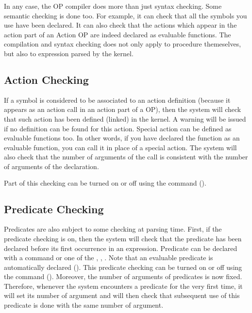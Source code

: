 In any case, the OP compiler does more than just syntax checking. Some
semantic checking is done too. For example, it can check that all the
symbols you use have been declared. It can also check that the actions
which appear in the action part of an Action OP are indeed declared as
evaluable functions. The compilation and syntax checking does not only apply to
procedure themeselves, but also to expression parsed by the kernel.



\subsection{Action Checking}

If a symbol is considered to be associated to an action definition
(because it appears as an action call in an action part of a OP), then
the system will check that such action has been defined (linked) in the
kernel. A warning will be issued if no definition can be found for this
action. Special action can be defined as evaluable functions too. In other
words, if you have declared the function  as an evaluable
function, you can call it in place of a special action. The system will also
check that the number of arguments of the call is consistent with the number of
arguments of the declaration.

Part of this checking can be turned on or off using the  command ().

\subsection{Predicate Checking}

Predicates are also subject to some checking at parsing time. First, if the
predicate checking is on, then the system will check that the predicate has
been declared before its first occurrence in an expression. Predicate can be
declared with a  command or one of the , , . Note that an evaluable
predicate is automatically declared (). This predicate checking can be turned on or off using the  command (). Moreover,
the number of arguments of predicates is now fixed. Therefore, whenever the
system encounters a predicate for the very first time, it will set its number
of argument and will then check that subsequent use of this predicate is done
with the same number of argument.


